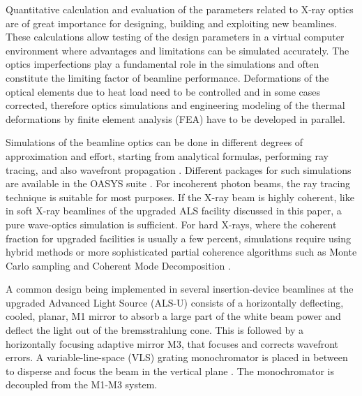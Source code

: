 \documentclass[preprint]{iucr}
\begin{document}
Quantitative calculation and evaluation of the parameters related to X-ray optics are of great importance for designing, building and exploiting new beamlines. These calculations allow testing of the design parameters in a virtual computer environment where advantages and limitations can be simulated accurately. The optics imperfections play a fundamental role in the simulations and often constitute the limiting factor of beamline performance. Deformations of the optical elements due to heat load need to be controlled and in some cases corrected, therefore optics simulations and engineering modeling of the thermal deformations by finite element analysis (FEA) have to be developed in parallel. 

Simulations of the beamline optics can be done in different degrees of approximation and effort, starting from analytical formulas, performing ray tracing, and also wavefront propagation \cite{hyerarchical}. Different packages for such simulations are available in the OASYS suite \cite{codeOASYS}. For incoherent photon beams, the ray tracing technique is suitable for most purposes. If the X-ray beam is highly coherent, like in soft X-ray beamlines of the upgraded ALS facility discussed in this paper, a pure wave-optics simulation is sufficient. For hard X-rays, where the coherent fraction for upgraded facilities is usually a few percent, simulations require using hybrid methods \cite{hybrid} or more sophisticated partial coherence algorithms such as Monte Carlo sampling \cite{Chubar2011b} and Coherent Mode Decomposition \cite{codeCOMSYL}. 

A common design being implemented in several insertion-device beamlines at the upgraded Advanced Light Source (ALS-U) consists of a horizontally deflecting, cooled, planar, M1 mirror to absorb a large part of the white beam power and deflect the light out of the bremsstrahlung cone. This is followed by a horizontally focusing adaptive mirror M3, that focuses and corrects wavefront errors. A variable-line-space (VLS) grating monochromator is placed in between to disperse and focus the beam in the vertical plane \cite{reininger2005}. The monochromator is decoupled from the M1-M3 system. 
\end{document}

